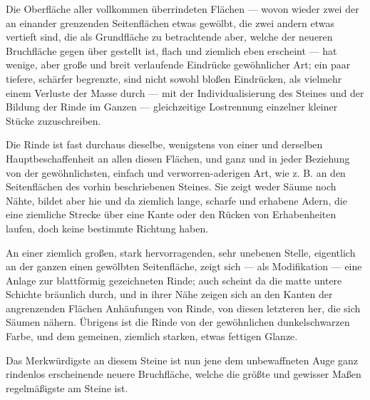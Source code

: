 \documentclass[a4paper, 11pt, oneside, german]{article}
\begin{document}
Die Oberfläche aller vollkommen überrindeten Flächen --- wovon wieder zwei der an einander grenzenden Seitenflächen etwas gewölbt, die zwei andern etwas vertieft sind, die als Grundfläche zu betrachtende aber, welche der neueren Bruchfläche gegen über gestellt ist, flach und ziemlich eben erscheint --- hat wenige, aber große und breit verlaufende Eindrücke gewöhnlicher Art; ein paar tiefere, schärfer begrenzte, sind nicht sowohl bloßen Eindrücken, als vielmehr einem Verluste der Masse durch --- mit der Individualisierung des Steines und der Bildung der Rinde im Ganzen --- gleichzeitige Lostrennung einzelner kleiner Stücke zuzuschreiben.

Die Rinde ist fast durchaus dieselbe, wenigstens von einer und derselben Hauptbeschaffenheit an allen diesen Flächen, und ganz und in jeder Beziehung von der gewöhnlichsten, einfach und verworren-aderigen Art, wie z. B. an den Seitenflächen des vorhin beschriebenen Steines. Sie zeigt weder Säume noch Nähte, bildet aber hie und da ziemlich lange, scharfe und erhabene Adern, die eine ziemliche Strecke über eine Kante oder den Rücken von Erhabenheiten laufen, doch keine bestimmte Richtung haben.

An einer ziemlich großen, stark hervorragenden, sehr unebenen Stelle, eigentlich an der ganzen einen gewölbten Seitenfläche, zeigt sich --- als Modifikation --- eine Anlage zur blattförmig gezeichneten Rinde; auch scheint da die matte untere Schichte bräunlich durch, und in ihrer Nähe zeigen sich an den Kanten der angrenzenden Flächen Anhäufungen von Rinde, von diesen letzteren her, die sich Säumen nähern. Übrigens ist die Rinde von der gewöhnlichen dunkelschwarzen Farbe, und dem gemeinen, ziemlich starken, etwas fettigen Glanze.

Das Merkwürdigste an diesem Steine ist nun jene dem unbewaffneten Auge ganz rindenlos erscheinende neuere Bruchfläche, welche die größte und gewisser Maßen regelmäßigste am Steine ist.
\end{document}
